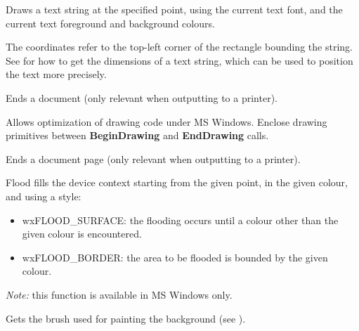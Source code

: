 
Draws a text string at the specified point, using the current text font,
and the current text foreground and background colours.

The coordinates refer to the top-left corner of the rectangle bounding
the string. See  for how
to get the dimensions of a text string, which can be used to position the
text more precisely.

\label{wxdcenddoc}


Ends a document (only relevant when outputting to a printer).

\label{wxdcenddrawing}


Allows optimization of drawing code under MS Windows. Enclose
drawing primitives between {\bf BeginDrawing} and {\bf EndDrawing}\rtfsp
calls.

\label{wxdcendpage}


Ends a document page (only relevant when outputting to a printer).

\label{wxdcfloodfill}


Flood fills the device context starting from the given point, in the given colour,
and using a style:

\begin{itemize}\itemsep=0pt
\item wxFLOOD\_SURFACE: the flooding occurs until a colour other than the given colour is encountered.
\item wxFLOOD\_BORDER: the area to be flooded is bounded by the given colour.
\end{itemize}

{\it Note:} this function is available in MS Windows only.

\label{wxdcgetbackground}


Gets the brush used for painting the background (see ).

